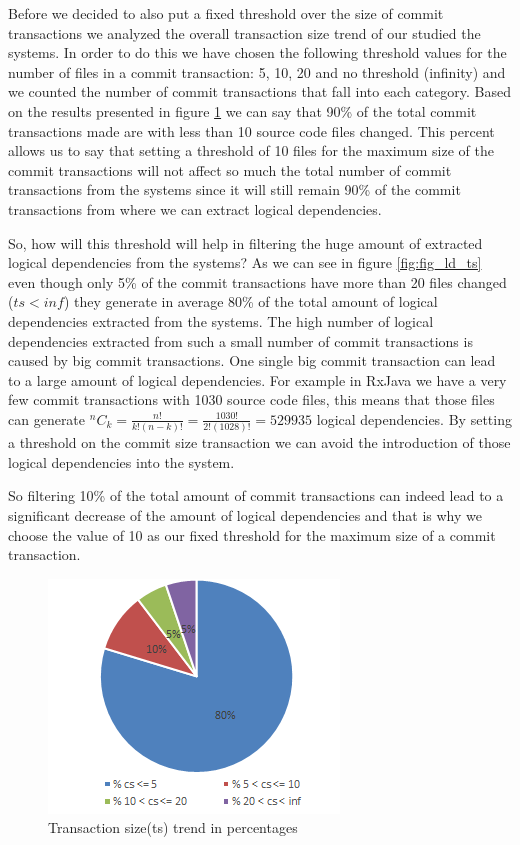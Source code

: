 \documentclass[conference]{IEEEtran}
\newcommand*{\Comb}[2]{{}^{#1}C_{#2}}%
\begin{document}
Before we decided to also put a fixed threshold over the size of commit transactions we analyzed the overall transaction size trend of our studied the systems.
In order to do this we have chosen the following threshold values for the number of files in a commit transaction: 5, 10, 20 and no threshold (infinity) and we counted the number of commit transactions that fall into each category.
Based on the results presented in figure \ref{fig:fig_cs} we can say that 90\% of the total commit transactions made are with less than 10 source code files changed. This percent allows us to say that setting a threshold of 10 files for the maximum size of the commit transactions will not affect so much the total number of commit transactions from the systems since it will still remain 90\% of the commit transactions from where we can extract logical dependencies.

So, how will this threshold will help in filtering the huge amount of extracted logical dependencies from the systems?
As we can see in figure \ref{fig:fig_ld_ts} even though only 5\% of the commit transactions have more than 20 files changed ($ts<inf$) they generate in average 80\% of the total amount of logical dependencies extracted from the systems.
The high number of logical dependencies extracted from such a small number of commit transactions is caused by big commit transactions. 
One single big commit transaction can lead to a large amount of logical dependencies. For example in RxJava we have a very few commit transactions with 1030 source code files, this means that those files can generate 
$\Comb{n}{k}=\frac{n!}{k!(n-k)!} = \frac{1030!}{2!(1028)!} = 529 935$ logical dependencies. By setting a threshold on the commit size transaction we can avoid the introduction of those logical dependencies into the system.

So filtering 10\% of the total amount of commit transactions can indeed lead to a significant decrease of the amount of logical dependencies and that is why we choose the value of 10 as our fixed threshold for the maximum size of a commit transaction.

\begin{figure}[h]
\includegraphics[scale=0.9]{fig_cs.png}
\caption{Transaction size(ts) trend in percentages}
\label{fig:fig_cs}
\centering
\end{figure}
\end{document}
